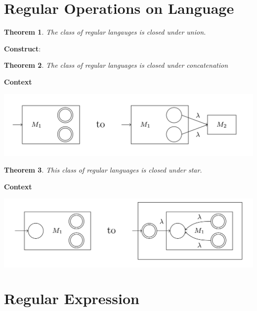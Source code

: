 \documentclass[oneside, 12pt]{book}
\newtheorem{theorem}{Theorem}
\begin{document}
\section{Regular Operations on Language}

\begin{theorem}
The class of regular langauges is closed under union.
\end{theorem}

\textbf{Construct}:



\begin{theorem}
The class of regular languages is closed under concatenation
\end{theorem}

\textbf{Context}


\includegraphics[width=\textwidth]{concat}


\begin{theorem}
This class of regular languages is closed under star.
\end{theorem}
\textbf{Context}

\includegraphics[width=\textwidth]{star}


\section{Regular Expression}
\end{document}
